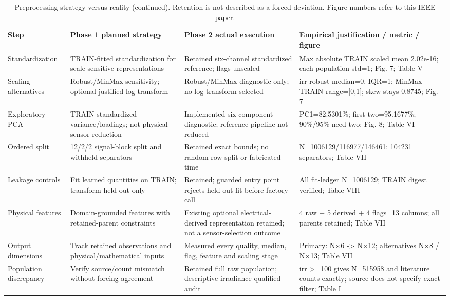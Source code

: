 \documentclass[conference]{IEEEtran}
\begin{document}
\begin{table}[!t]
\caption{Preprocessing strategy versus reality (continued). Retention is not described as a forced deviation. Figure numbers refer to this IEEE paper.}\label{tab:strategy2}
\centering\footnotesize
\begin{tabularx}{\textwidth}{YYYY}
\toprule
Step & Phase 1 planned strategy & Phase 2 actual execution & Empirical justification / metric / figure \\ \midrule
Standardization & TRAIN-fitted standardization for scale-sensitive representations & Retained six-channel standardized reference; flags unscaled & Max absolute TRAIN scaled mean 2.02e-16; each population std=1; Fig. 7; Table V \\
Scaling alternatives & Robust/MinMax sensitivity; optional justified log transform & Robust/MinMax diagnostic only; no log transform selected & irr robust median=0, IQR=1; MinMax TRAIN range=[0,1]; skew stays 0.8745; Fig. 7 \\
Exploratory PCA & TRAIN-standardized variance/loadings; not physical sensor reduction & Implemented six-component diagnostic; reference pipeline not reduced & PC1=82.5301\%; first two=95.1677\%; 90\%/95\% need two; Fig. 8; Table VI \\
Ordered split & 12/2/2 signal-block split and withheld separators & Retained exact bounds; no random row split or fabricated time & N=1006129/116977/146461; 104231 separators; Table VII \\
Leakage controls & Fit learned quantities on TRAIN; transform held-out only & Retained; guarded entry point rejects held-out fit before factory call & All fit-ledger N=1006129; TRAIN digest verified; Table VIII \\
Physical features & Domain-grounded features with retained-parent constraints & Existing optional electrical-derived representation retained; not a sensor-selection outcome & 4 raw + 5 derived + 4 flags=13 columns; all parents retained; Table VII \\
Output dimensions & Track retained observations and physical/mathematical inputs & Measured every quality, median, flag, feature and scaling stage & Primary: N$\times$6 -> N$\times$12; alternatives N$\times$8 / N$\times$13; Table VII \\
Population discrepancy & Verify source/count mismatch without forcing agreement & Retained full raw population; descriptive irradiance-qualified audit & irr >=100 gives N=515958 and literature counts exactly; source does not specify exact filter; Table I \\
\bottomrule
\end{tabularx}
\end{table}
\end{document}
